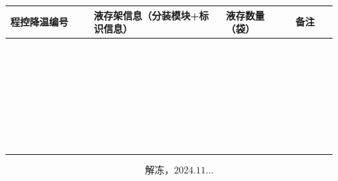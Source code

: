 \documentclass[UTF8,10pt,a4paper,fontset=fandol]{ctexart}
\newcommand{\handwritten}[1]{#1}
\begin{document}
\begin{center}
\small
\begin{tabular}{|p{0.24\linewidth}|p{0.38\linewidth}|p{0.20\linewidth}|p{0.12\linewidth}|}
\hline
\centering 程控降温编号
&
\centering 液存架信息（分装模块+标识信息）
&
\centering 液存数量（袋）
&
\centering 备注
\\
\hline
&&&\\[-2pt]\hline
&&&\\[-2pt]\hline
&&&\\[-2pt]\hline
&&&\\[-2pt]\hline
&&&\\[-2pt]\hline
&&&\\[-2pt]\hline
&&&\\[-2pt]\hline
&&&\\[-2pt]\hline
&&&\\[-2pt]\hline
&&&\\[-2pt]\hline
&&&\\[-2pt]\hline
&&&\\[-2pt]\hline
&&&\\[-2pt]\hline
&&&\\[-2pt]\hline
&&&\\[-2pt]\hline
&&&\\[-2pt]\hline
&&&\\[-2pt]\hline
&&&\\[-2pt]\hline
&&&\\[-2pt]\hline
&&&\\[-2pt]\hline
&&&\\[-2pt]\hline
&&&\\[-2pt]\hline
&&&\\[-2pt]\hline
&&&\\[-2pt]\hline
&&&\\[-2pt]\hline
&&&\\[-2pt]\hline
&&&\\[-2pt]\hline
&&&\\[-2pt]\hline
&&&\\[-2pt]\hline
&&&\\[-2pt]\hline
&&&\\[-2pt]\hline
&&&\\[-2pt]\hline
\end{tabular}
\end{center}

\[
\handwritten{\text{解冻，2024.11...}}
\]
\end{document}
